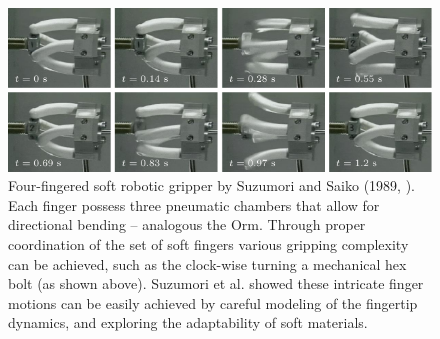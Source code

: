 \begin{figure}[!t]
  \includegraphics*[width=\textwidth]{./pdf/thesis-figure-2-7.pdf}
  \caption{Four-fingered soft robotic gripper by Suzumori and Saiko (1989, \cite{Suzumori1991,Suzumori1992}). Each finger possess three pneumatic chambers that allow for directional bending -- analogous the Orm. Through proper coordination of the set of soft fingers various gripping complexity can be achieved, such as the clock-wise turning a mechanical hex bolt (as shown above). Suzumori et al. showed these intricate finger motions can be easily achieved by careful modeling of the fingertip dynamics, and exploring the adaptability of soft materials.
  \label{fig:C0:fist_grip_robot}}
  \vspace{-3mm}
\end{figure}


